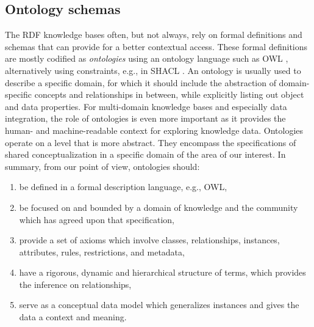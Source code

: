 \subsection{Ontology schemas} 
The RDF knowledge bases often, but not always, rely on formal definitions and schemas that can provide for a better contextual access. These formal definitions are mostly codified as \textit{ontologies} using an ontology language such as OWL \cite{mcguinness2004owl}, alternatively using constraints, e.g., in SHACL \cite{knublauch2017shapes}. An ontology is usually used to describe a specific domain, for which it should include the abstraction of domain-specific concepts and relationships in between, while explicitly listing out object and data properties. For multi-domain knowledge bases and especially data integration, the role of ontologies is even more important as it provides the human- and machine-readable context for exploring knowledge data.
Ontologies operate on a level that is more abstract. They encompass the specifications of shared conceptualization in a specific domain of the area of our interest. In summary, from our point of view, ontologies should:
\begin{enumerate}
    \item be defined in a formal description language, e.g., OWL,
    \item be focused on and bounded by a domain of knowledge and the community which has agreed upon that specification,
    \item provide a set of axioms which involve classes, relationships, instances, attributes, rules, restrictions, and metadata,
    \item have a rigorous, dynamic and hierarchical structure of terms, which provides the inference on relationships,
    \item serve as a conceptual data model which generalizes instances and gives the data a context and meaning.
\end{enumerate}

